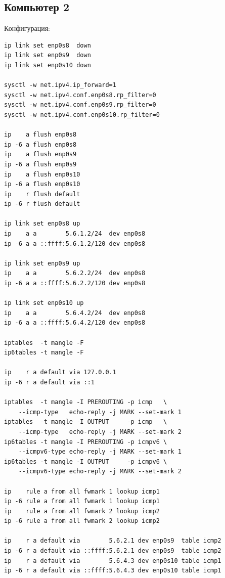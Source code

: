 \subsection{Компьютер 2}
Конфигурация:
\begin{verbatim}
ip link set enp0s8  down
ip link set enp0s9  down
ip link set enp0s10 down

sysctl -w net.ipv4.ip_forward=1
sysctl -w net.ipv4.conf.enp0s8.rp_filter=0
sysctl -w net.ipv4.conf.enp0s9.rp_filter=0
sysctl -w net.ipv4.conf.enp0s10.rp_filter=0

ip    a flush enp0s8
ip -6 a flush enp0s8
ip    a flush enp0s9
ip -6 a flush enp0s9
ip    a flush enp0s10
ip -6 a flush enp0s10
ip    r flush default
ip -6 r flush default

ip link set enp0s8 up
ip    a a        5.6.1.2/24  dev enp0s8
ip -6 a a ::ffff:5.6.1.2/120 dev enp0s8

ip link set enp0s9 up
ip    a a        5.6.2.2/24  dev enp0s8
ip -6 a a ::ffff:5.6.2.2/120 dev enp0s8

ip link set enp0s10 up
ip    a a        5.6.4.2/24  dev enp0s8
ip -6 a a ::ffff:5.6.4.2/120 dev enp0s8

iptables  -t mangle -F
ip6tables -t mangle -F

ip    r a default via 127.0.0.1
ip -6 r a default via ::1

iptables  -t mangle -I PREROUTING -p icmp   \
    --icmp-type   echo-reply -j MARK --set-mark 1
iptables  -t mangle -I OUTPUT     -p icmp   \
    --icmp-type   echo-reply -j MARK --set-mark 2
ip6tables -t mangle -I PREROUTING -p icmpv6 \
    --icmpv6-type echo-reply -j MARK --set-mark 1
ip6tables -t mangle -I OUTPUT     -p icmpv6 \
    --icmpv6-type echo-reply -j MARK --set-mark 2

ip    rule a from all fwmark 1 lookup icmp1
ip -6 rule a from all fwmark 1 lookup icmp1
ip    rule a from all fwmark 2 lookup icmp2
ip -6 rule a from all fwmark 2 lookup icmp2

ip    r a default via        5.6.2.1 dev enp0s9  table icmp2
ip -6 r a default via ::ffff:5.6.2.1 dev enp0s9  table icmp2
ip    r a default via        5.6.4.3 dev enp0s10 table icmp1
ip -6 r a default via ::ffff:5.6.4.3 dev enp0s10 table icmp1
\end{verbatim}

